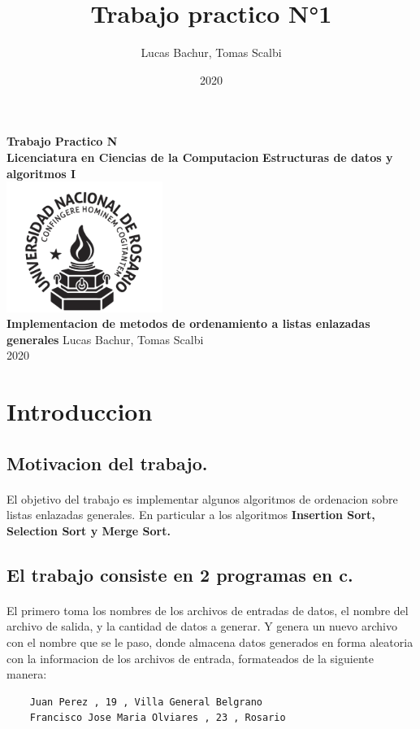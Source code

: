 \documentclass{article}
\title{Trabajo practico N°1}
\author{Lucas Bachur, Tomas Scalbi}
\date{2020}
\begin{document}
	\thispagestyle{empty}
	\begin{center}
		\Huge
		\textbf{Trabajo Practico N}\\
		\LARGE
		\vfill
		\textbf{Licenciatura en Ciencias de la Computacion}
		\vfill
		\textbf{Estructuras de datos y algoritmos I} \\
		\vfill
		\includegraphics[width=2in]{UNRlogo.png} \\
		\vfill
		\textbf{Implementacion de metodos de ordenamiento a listas enlazadas generales}
		\vfill
		Lucas Bachur, Tomas Scalbi \\
		2020 \\
	\end{center}
	\pagebreak
	
	\tableofcontents
	
	\pagebreak
	\section{Introduccion}
	\subsection{Motivacion del trabajo.}
	\paragraph{}
	El objetivo del trabajo es implementar algunos algoritmos de ordenacion sobre listas enlazadas generales. En particular a los algoritmos \textbf{Insertion Sort, Selection Sort y Merge Sort.}\\
	\subsection{El trabajo consiste en 2 programas en c.}
	\paragraph{}
	El primero toma los nombres de los archivos de entradas de datos, el nombre del archivo de salida, y la cantidad de datos a generar. Y genera un nuevo archivo con el nombre que se le paso, donde almacena datos generados en forma aleatoria con la informacion de los archivos de entrada, formateados de la siguiente manera:
	\begin{verbatim}
	Juan Perez , 19 , Villa General Belgrano 
	Francisco Jose Maria Olviares , 23 , Rosario
	\end{verbatim}
\end{document}
